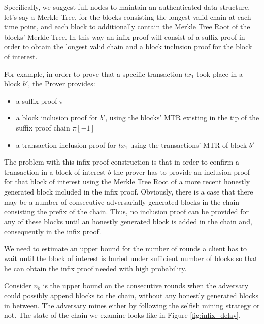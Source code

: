 \documentclass[10pt,a4paper]{article}
\theoremstyle{plain}
\theoremstyle{definition}
\theoremstyle{lemma}
\theoremstyle{corollary}
\begin{document}
Specifically, we suggest full nodes to maintain an authenticated data structure, let's say a
Merkle Tree, for the blocks consisting the longest valid chain at each time point, and each
block to additionally contain the Merkle Tree Root of  the blocks' Merkle Tree. In this way an
infix proof will consist of a suffix proof in order to obtain the longest valid chain and a
block inclusion proof for the block of interest.

For example, in order to prove that a specific transaction $tx_1$ took place in a block $b'$,
the Prover provides:
\begin{itemize}
\item a suffix proof $\pi$
\item a block inclusion proof for $b'$, using the blocks' MTR existing in the tip of the
suffix proof chain $\pi[-1]$
\item a transaction inclusion proof for $tx_1$ using the transactions' MTR of block $b'$
\end{itemize}


The problem with this infix proof construction is that in order to confirm a
transaction in a block of interest $b$ the prover has to provide an inclusion
proof for that block of interest using the Merkle Tree Root of a more recent
honestly generated block included in the infix proof. Obviously, there is a case
that there may be a number of consecutive adversarially generated blocks in the
chain   consisting the prefix of the chain. Thus, no inclusion proof can be provided
for any of these blocks until an honestly generated block is added in the chain and,
consequently in the infix proof.

We need to estimate an upper bound for the number of rounds a client has to
wait until the block of interest is buried under sufficient number of blocks
so that he can obtain the infix proof needed with high probability.

Consider $n_b$ is the upper bound on the consecutive rounds when the adversary could
possibly append blocks to the chain, without any honestly generated blocks in
between. The adversary mines either by following the selfish mining strategy or
not. The state of the chain we examine looks like in Figure \ref{fig:infix_delay}.
\end{document}
